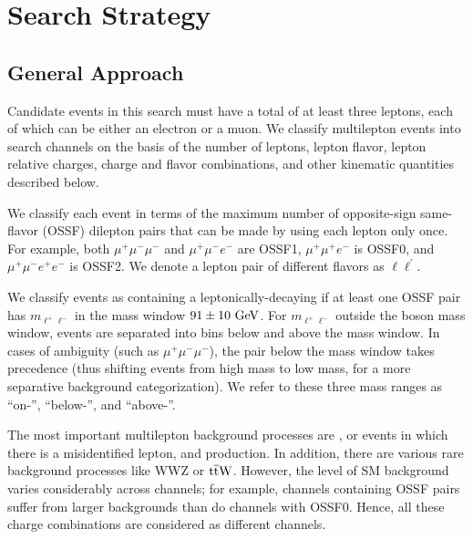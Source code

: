 \chapter{Search Strategy}
\label{chap:Strategy}

\section{General Approach}

Candidate events in this search must have a total of at least three leptons, each of which can be either an electron or a muon. We classify multilepton events into search channels on the basis of the number of leptons, lepton flavor, lepton relative charges, charge and flavor combinations, and other kinematic quantities described below.

We classify each event in terms of the maximum number of opposite-sign same-flavor (OSSF) dilepton pairs that can be made by using each lepton only once. For example, both $\mu^+\mu^-\mu^-$ and $\mu^+\mu^-e^-$ are OSSF1, $\mu^+\mu^+e^-$ is OSSF0, and $\mu^+\mu^-e^+e^-$ is OSSF2. We denote a lepton pair of different flavors as $\ell\ell^\prime$.

We classify events as containing a leptonically-decaying \Z if at least one OSSF pair has $m_{\ell^+\ell^-}$ in the \Z mass window $91 \pm 10\,\,\text{Ge\hspace{-.08em}V}$. For $m_{\ell^+\ell^-}$ outside the \Z boson mass window, events are separated into bins below and above the \Z mass window. In cases of ambiguity (such as $\mu^+\mu^-\mu^-$), the pair below the \Z mass window takes precedence (thus shifting events from high mass to low mass, for a more separative background categorization). We refer to these three mass ranges as ``on-\Z'', ``below-\Z'', and ``above-\Z''.

The most important multilepton background processes are \WZ, \Z or \ttbar events in which there is a misidentified lepton, and \ZZ production. In addition, there are various rare background processes like WWZ or $\mathrm{t}\overline{\mathrm{t}}\mathrm{W}$. However, the level of SM background varies considerably across channels; for example, channels containing OSSF pairs suffer from larger backgrounds than do channels with OSSF0. Hence, all these charge combinations are considered as different channels.


